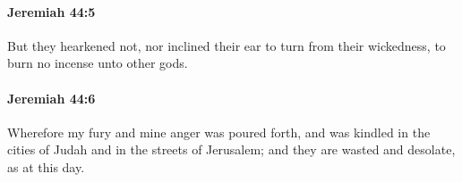 		\paragraph{Jeremiah 44:5} %
			\label{JEREMIAH-44-5}

			But they hearkened not, nor inclined their ear to turn from their wickedness, to burn no incense unto other gods.


		\paragraph{Jeremiah 44:6} %
			\label{JEREMIAH-44-6}

			Wherefore my fury and mine anger was poured forth, and was kindled in the cities of Judah and in the streets of Jerusalem; and they are wasted and desolate, as at this day.


